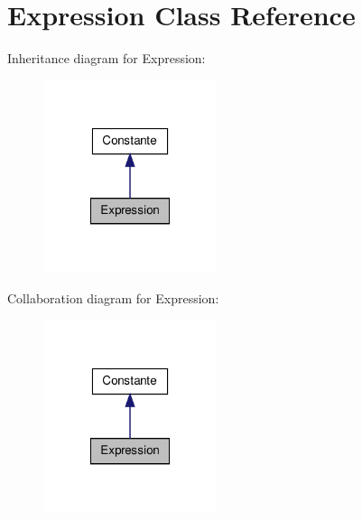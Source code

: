 \hypertarget{class_expression}{\section{\-Expression \-Class \-Reference}
\label{class_expression}
}


\-Inheritance diagram for \-Expression\-:
\nopagebreak
\begin{figure}[H]
\begin{center}
\leavevmode
\includegraphics[width=144pt]{class_expression__inherit__graph}
\end{center}
\end{figure}


\-Collaboration diagram for \-Expression\-:
\nopagebreak
\begin{figure}[H]
\begin{center}
\leavevmode
\includegraphics[width=144pt]{class_expression__coll__graph}
\end{center}
\end{figure}
